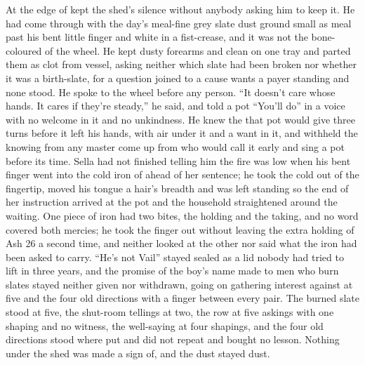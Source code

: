 At the edge of   kept the shed's silence without anybody asking him to keep it. He had come through  with the day's meal-fine grey slate dust ground small as meal past his bent little finger and white in a fist-crease, and it was not the bone-coloured  of the wheel. He kept dusty forearms and clean on one tray and parted them as clot from vessel, asking neither which slate had been broken nor whether it was a birth-slate, for a question joined to a cause wants a payer standing and none stood. He spoke to the wheel before any person. “It doesn't care whose hands. It cares if they're steady,” he said, and told a pot “You'll do” in a voice with no welcome in it and no unkindness. He knew the  that pot would give three turns before it left his hands, with air under it and a want in it, and withheld the knowing from any master come up from  who would call it early and sing a pot before its time. Sella had not finished telling him the fire was low when his bent finger went into the cold iron of  ahead of her sentence; he took the cold out of the fingertip, moved his tongue a hair's breadth and was left standing so the end of her instruction arrived at the pot and the household straightened around the waiting. One piece of iron had two bites, the holding and the taking, and no  word covered both mercies; he took the finger out without leaving the extra holding of Ash 26 a second time, and neither looked at the other nor said what the iron had been asked to carry. “He's not Vail” stayed sealed as a lid nobody had tried to lift in three years, and the promise of the boy's name made to men who burn slates stayed neither given nor withdrawn, going on gathering interest against  at five and the four old directions with a finger between every pair. The burned slate stood at five, the shut-room tellings at two, the row at five askings with one shaping and no witness, the well-saying at four shapings, and the four old directions stood where put and did not repeat and bought no lesson. Nothing under the shed was made a sign of, and the dust stayed dust.

